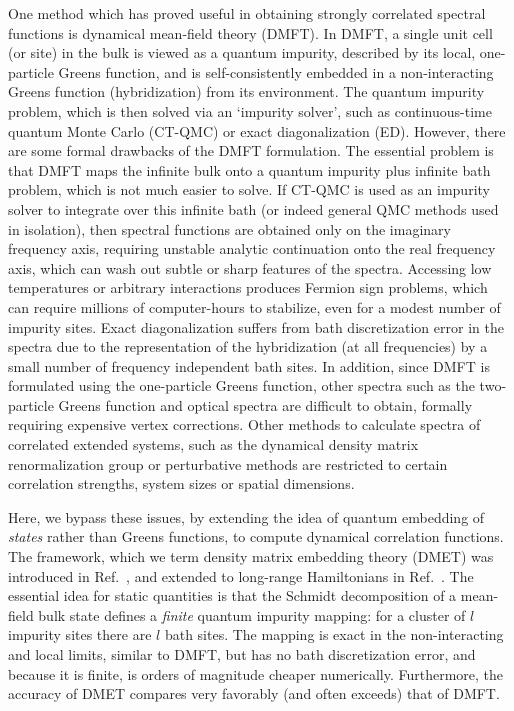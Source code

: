 \documentclass[aps,twocolumn,nobibnotes]{revtex4}
\begin{document}
One method which has proved useful in obtaining strongly correlated spectral functions is dynamical mean-field 
theory (DMFT)\cite{Georges1992,Georges1996,Kotliar2006}. In 
DMFT, a single unit cell (or site) in the bulk is viewed as a quantum impurity, described by its local, one-particle Greens function,
and is self-consistently embedded in a non-interacting Greens function (hybridization) from its environment.
The quantum impurity problem, which is then solved via an `impurity solver', such as
continuous-time quantum Monte Carlo (CT-QMC)\cite{Millis2006} or exact diagonalization (ED)\cite{Zgid2012}. 
However, there are some formal drawbacks of the DMFT formulation. 
The essential problem is that DMFT maps the infinite bulk onto a quantum impurity plus infinite bath problem, which is not much easier to solve.
If CT-QMC is used as an 
impurity solver to integrate over this infinite bath (or indeed general QMC methods used in isolation), then spectral 
functions are obtained only on the imaginary frequency 
axis, requiring unstable analytic continuation onto the real frequency axis, which can wash out subtle or sharp features of the 
spectra\cite{Thomas2011}. Accessing low temperatures or arbitrary interactions produces Fermion sign problems, which can require millions
of computer-hours to stabilize, even for a modest number of impurity sites.
Exact diagonalization suffers from bath discretization error in the spectra due to the 
representation of the hybridization (at all frequencies) by a small number of frequency independent bath sites. In addition, since DMFT
is formulated using the one-particle Greens function, other spectra such as the two-particle Greens function and optical spectra are 
difficult to obtain, formally requiring expensive vertex corrections\cite{Millis2012}. Other methods to calculate 
spectra of correlated extended systems, such as the dynamical density matrix renormalization group\cite{Jeckelmann2004} or perturbative
methods\cite{Senechal2000} are restricted to certain correlation strengths, system sizes or spatial dimensions.

Here, we bypass these issues, by extending the idea of quantum embedding of {\em states} rather than Greens functions, to compute dynamical
correlation functions. The framework, which we term density matrix embedding theory (DMET) was introduced in 
Ref.~, and extended to long-range Hamiltonians in Ref.~. 
The essential idea for static quantities is that the Schmidt decomposition of a mean-field bulk state defines a {\em finite} quantum impurity mapping:
for a cluster of $l$ impurity sites there are $l$ bath sites. The mapping is exact in the non-interacting and local limits, similar to DMFT, but
has no bath discretization error, and because it is finite, is orders of magnitude cheaper numerically. Furthermore, the accuracy of DMET compares
very favorably (and often exceeds) that of DMFT.
\end{document}

